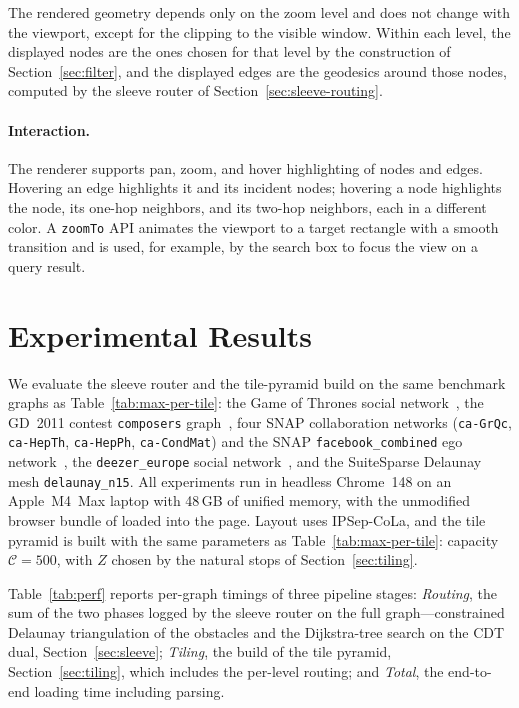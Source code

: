 The rendered geometry depends only on the zoom level and does not
change with the viewport, except for the clipping to the visible
window. Within each level, the displayed nodes are the ones chosen
for that level by the construction of Section~\ref{sec:filter}, and
the displayed edges are the geodesics around those nodes,
computed by the sleeve router of Section~\ref{sec:sleeve-routing}.

\paragraph{Interaction.}
The renderer supports pan, zoom, and hover highlighting of nodes and
edges. Hovering an edge highlights it and its incident nodes; hovering
a node highlights the node, its one-hop neighbors, and its two-hop
neighbors, each in a different color. A \texttt{zoomTo} API animates
the viewport to a target rectangle with a smooth transition and is
used, for example, by the search box to focus the view on a query
result.
\section{Experimental Results}
\label{sec:experiments}

We evaluate the sleeve router and the tile-pyramid build on the same benchmark graphs as Table~\ref{tab:max-per-tile}: the Game of Thrones social network~\cite{beveridge2018game}, the GD~2011 contest \texttt{composers} graph~\cite{composers}, four SNAP collaboration networks (\texttt{ca-GrQc}, \texttt{ca-HepTh}, \texttt{ca-HepPh}, \texttt{ca-CondMat}) and the SNAP \texttt{facebook\_combined} ego network~\cite{leskovec2007graph,fb}, the \texttt{deezer\_europe} social network~\cite{feather}, and the SuiteSparse Delaunay mesh \texttt{delaunay\_n15}. All experiments run in headless Chrome~148 on an Apple~M4~Max laptop with 48\,GB of unified memory, with the unmodified browser bundle of \msagljs{} loaded into the page. Layout uses IPSep-CoLa, and the tile pyramid is built with the same parameters as Table~\ref{tab:max-per-tile}: capacity~$\mathcal{C}=500$, with $Z$ chosen by the natural stops of Section~\ref{sec:tiling}.

Table~\ref{tab:perf} reports per-graph timings of three pipeline stages: \emph{Routing}, the sum of the two phases logged by the sleeve router on the full graph---constrained Delaunay triangulation of the obstacles and the Dijkstra-tree search on the CDT dual, Section~\ref{sec:sleeve}; \emph{Tiling}, the build of the tile pyramid, Section~\ref{sec:tiling}, which includes the per-level routing; and \emph{Total}, the end-to-end loading time including parsing.

